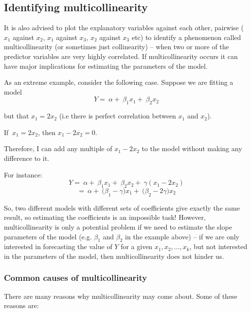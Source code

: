 \documentclass[12pt,a4paper,openany,twoside]{report}
\theoremstyle{definition}
\theoremstyle{remark}
\theoremstyle{plain}
\theoremstyle{definition}
\theoremstyle{definition}
\theoremstyle{definition}
\theoremstyle{remark}
\begin{document}
\hypertarget{mlrmulticol}{%
\subsection{Identifying multicollinearity}\label{mlrmulticol}}

It is also advised to plot the explanatory variables against each other,
pairwise (\(x_{1}\) against \(x_{2}\), \(x_{1}\) against \(x_{3}\),
\(x_{2}\) against \(x_{3}\) etc) to identify a phenomenon called
multicollinearity (or sometimes just collinearity) -- when two or more
of the predictor variables are very highly correlated. If
multicollinearity occurs it can have major implications for estimating
the parameters of the model.

As an extreme example, consider the following case. Suppose we are
fitting a model
\[Y = \ \alpha + \ \beta_{1}x_{1} + \ \beta_{2}x_{2}\]

but that \(x_{1} = 2x_{2}\) (i.e there is perfect correlation between
\(x_{1}\) and \(x_{2}\)).

If \(\ x_{1} = 2x_{2}\), then \(x_{1} - 2x_{2} = 0\).

Therefore, I can add any multiple of \(x_{1} - 2x_{2}\) to the model without making any difference to it.

For instance:
\[Y = \ \alpha + \ \beta_{1}x_{1} + \ \beta_{2}x_{2} + \ \gamma(x_{1} - 2x_{2})\]
\[= \ \alpha + \ {(\beta}_{1} - \gamma)x_{1} + \ {(\beta}_{2} - 2\gamma)x_{2}\]

So, two different models with different sets of coefficients give
exactly the same result, so estimating the coefficients is an impossible
task! However, multicollinearity is only a potential problem if we need
to estimate the slope parameters of the model (e.g. \(\beta_{1}\) and
\(\beta_{2}\) in the example above) -- if we are only interested in
forecasting the value of \(Y\) for a given \(x_{1},x_{2},\ldots,x_{k}\),
but not interested in the parameters of the model, then
multicollinearity does not hinder us.

\hypertarget{common-causes-of-multicollinearity}{%
\subsubsection*{Common causes of multicollinearity}\label{common-causes-of-multicollinearity}}

There are many reasons why multicollinearity may come about. Some of these reasons are:
\end{document}
